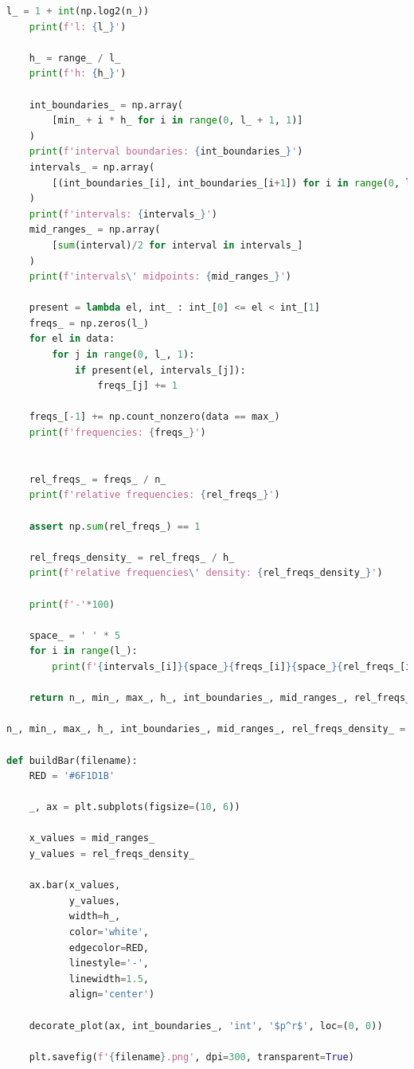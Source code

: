 \documentclass[a4paper, 14pt]{extarticle}
\begin{document}
\begin{center}
\begin{lstlisting}[language=Python]
    l_ = 1 + int(np.log2(n_))
    print(f'l: {l_}')

    h_ = range_ / l_
    print(f'h: {h_}')

    int_boundaries_ = np.array(
        [min_ + i * h_ for i in range(0, l_ + 1, 1)]
    )
    print(f'interval boundaries: {int_boundaries_}')
    intervals_ = np.array(
        [(int_boundaries_[i], int_boundaries_[i+1]) for i in range(0, l_, 1)]
    )
    print(f'intervals: {intervals_}')
    mid_ranges_ = np.array(
        [sum(interval)/2 for interval in intervals_]
    )
    print(f'intervals\' midpoints: {mid_ranges_}')

    present = lambda el, int_ : int_[0] <= el < int_[1]
    freqs_ = np.zeros(l_)
    for el in data:
        for j in range(0, l_, 1):
            if present(el, intervals_[j]):
                freqs_[j] += 1 

    freqs_[-1] += np.count_nonzero(data == max_)
    print(f'frequencies: {freqs_}')


    rel_freqs_ = freqs_ / n_
    print(f'relative frequencies: {rel_freqs_}')

    assert np.sum(rel_freqs_) == 1

    rel_freqs_density_ = rel_freqs_ / h_
    print(f'relative frequencies\' density: {rel_freqs_density_}')

    print(f'-'*100)

    space_ = ' ' * 5
    for i in range(l_):
        print(f'{intervals_[i]}{space_}{freqs_[i]}{space_}{rel_freqs_[i]}{space_}{rel_freqs_density_[i]}')
    
    return n_, min_, max_, h_, int_boundaries_, mid_ranges_, rel_freqs_density_

n_, min_, max_, h_, int_boundaries_, mid_ranges_, rel_freqs_density_ = group(data_)

def buildBar(filename):
    RED = '#6F1D1B'

    _, ax = plt.subplots(figsize=(10, 6))

    x_values = mid_ranges_
    y_values = rel_freqs_density_

    ax.bar(x_values, 
           y_values, 
           width=h_, 
           color='white',
           edgecolor=RED, 
           linestyle='-', 
           linewidth=1.5, 
           align='center')
    
    decorate_plot(ax, int_boundaries_, 'int', '$p^r$', loc=(0, 0))

    plt.savefig(f'{filename}.png', dpi=300, transparent=True)


\end{lstlisting}
\end{center}
\end{document}
